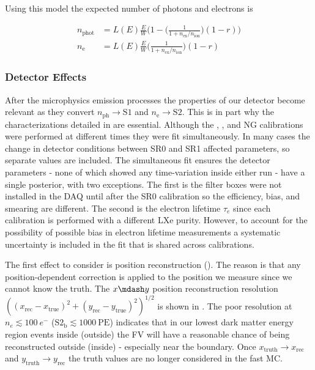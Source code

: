 Using this model the expected number of photons and electrons is

\begin{subequations}
\begin{align}
n_{\mathrm{phot}} &= L(E) \frac{E}{W} \Bigg(1 - \bigg(\frac{1}{1 + n_{\mathrm{ex}}/n_{\mathrm{ion}}} \bigg) (1 - r) \Bigg) \\
n_{\mathrm{e}} &= L(E) \frac{E}{W} \bigg(\frac{1}{1 + n_{\mathrm{ex}}/n_{\mathrm{ion}}} \bigg) (1 - r)
\end{align}
\end{subequations}



\subsubsection{Detector Effects}
\label{subsubsec:er_nr_calibrations_parameter_determ_det_phys}
After the microphysics emission processes the properties of our detector become relevant as they convert
$n_{\mathrm{ph}} \rightarrow \mathrm{S1}$ and $n_{\mathrm{e}} \rightarrow \mathrm{S2}$.  This is in part why the
characterizations detailed in  are essential.  Although the , , and NG calibrations
were performed at different times they were fit simultaneously.  In many cases the change in detector conditions between SR0 and SR1
affected parameters, so separate values are included.  The simultaneous fit ensures the detector parameters - none of which showed any
time-variation inside either run - have a single posterior, with two exceptions.  The first is the filter boxes were not installed in the
DAQ until after the SR0 \ambe calibration so the efficiency, bias, and smearing are different.  The second is the electron lifetime
$\tau_{e}$ since each calibration is performed with a different LXe purity.  However, to account for the possibility of possible bias in
electron lifetime measurements a systematic uncertainty is included in the fit that is shared across calibrations.

The first effect to consider is position reconstruction ().  The reason is that
any position-dependent correction is applied to the position we measure since we cannot know the truth.  The $x \mdash y$ position
reconstruction resolution $((x_{\mathrm{rec}} - x_{\mathrm{true}})^2 + (y_{\mathrm{rec}} - y_{\mathrm{true}})^2)^{1/2}$ is shown in
.  The poor resolution at
$n_e \lesssim 100\ e^-$ ($\mathrm{S2_b} \lesssim 1000\ \mathrm{PE}$) indicates that in our lowest dark matter energy region events inside
(outside) the FV will have a reasonable chance of being reconstructed outside (inside) - especially near the boundary.  Once
$x_{\mathrm{truth}} \rightarrow x_{\mathrm{rec}}$ and
$y_{\mathrm{truth}} \rightarrow y_{\mathrm{rec}}$ the truth values are no longer considered in the fast MC.



